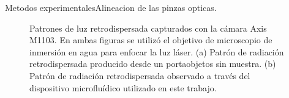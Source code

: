 \documentclass[10pt,aspectratio=1610,compress,dvipsnames]{beamer}
\begin{document}
\begin{frame}{Metodos experimentales}{Alineacion de las pinzas opticas.}
\begin{figure}[H]
    \centering
    \qquad
    \caption{Patrones de luz retrodispersada capturados con la cámara Axis M1103. En ambas figuras se utilizó el objetivo de microscopio de inmersión en agua para enfocar la luz láser. (a) Patrón de radiación retrodispersada producido desde un portaobjetos sin muestra. (b) Patrón de radiación retrodispersada observado a través del dispositivo microfluídico utilizado en este trabajo.}%
    \label{symmetricpattern}%
\end{figure}
\end{frame}
\end{document}
